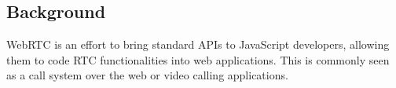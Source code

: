 %
%
%
%

\subsection{Background}

WebRTC is an effort to bring standard APIs to JavaScript developers, allowing them to code RTC functionalities into web applications. This is commonly seen as a call system over the web or video calling applications. 

